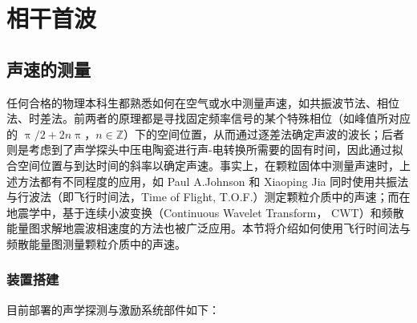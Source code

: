 
\chapter{相干首波}

\section{声速的测量}

任何合格的物理本科生都熟悉如何在空气或水中测量声速，如共振波节法、相位法、时差法。前两者的原理都是寻找固定频率信号的某个特殊相位（如峰值所对应的 $\uppi/2 + 2n\uppi$，$n\in\mathbb{Z}$）下的空间位置，从而通过逐差法确定声波的波长；后者则是考虑到了声学探头中压电陶瓷进行声-电转换所需要的固有时间，因此通过拟合空间位置与到达时间的斜率以确定声速。事实上，在颗粒固体中测量声速时，上述方法都有不同程度的应用，如 Paul A.Johnson 和 Xiaoping Jia 同时使用共振法与行波法（即飞行时间法，Time of Flight, T.O.F.）测定颗粒介质中的声速\cite{Johnson_2005}；而在地震学中，基于连续小波变换（Continuous Wavelet Transform， CWT）和频散能量图求解地震波相速度的方法也被广泛应用。本节将介绍如何使用飞行时间法与频散能量图测量颗粒介质中的声速。

\subsection{装置搭建}

目前部署的声学探测与激励系统部件如下：

